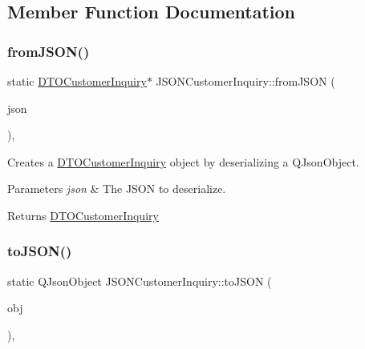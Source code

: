 \subsection{Member Function Documentation}
\mbox{\label{struct_j_s_o_n_customer_inquiry_a9b0e309ca1a6e1794f7f3473d42a7d2b}} 
\subsubsection{\texorpdfstring{fromJSON()}{fromJSON()}}
{\footnotesize\ttfamily static \mbox{\hyperlink{struct_d_t_o_customer_inquiry}{D\+T\+O\+Customer\+Inquiry}}$\ast$ J\+S\+O\+N\+Customer\+Inquiry\+::from\+J\+S\+ON (\begin{DoxyParamCaption}\item[{const Q\+Json\+Object \&}]{json }\end{DoxyParamCaption})\hspace{0.3cm}{\ttfamily [inline]}, {\ttfamily [static]}}



Creates a \mbox{\hyperlink{struct_d_t_o_customer_inquiry}{D\+T\+O\+Customer\+Inquiry}} object by deserializing a Q\+Json\+Object. 


\begin{DoxyParams}{Parameters}
{\em json} & The J\+S\+ON to deserialize. \\
\hline
\end{DoxyParams}
\begin{DoxyReturn}{Returns}
\mbox{\hyperlink{struct_d_t_o_customer_inquiry}{D\+T\+O\+Customer\+Inquiry}} 
\end{DoxyReturn}
\mbox{\label{struct_j_s_o_n_customer_inquiry_ac470def01a19da61aec37311cb2ed438}} 
\subsubsection{\texorpdfstring{toJSON()}{toJSON()}}
{\footnotesize\ttfamily static Q\+Json\+Object J\+S\+O\+N\+Customer\+Inquiry\+::to\+J\+S\+ON (\begin{DoxyParamCaption}\item[{const \mbox{\hyperlink{struct_d_t_o_customer_inquiry}{D\+T\+O\+Customer\+Inquiry}}}]{obj }\end{DoxyParamCaption})\hspace{0.3cm}{\ttfamily [inline]}, {\ttfamily [static]}}



